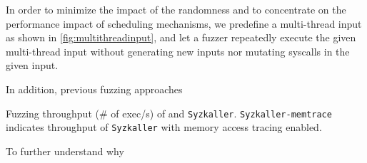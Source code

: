 In order to minimize the impact of the randomness and to concentrate
on the performance impact of scheduling mechanisms, we predefine a
multi-thread input as shown in \autoref{fig:multithreadinput}, and let
a fuzzer repeatedly execute the given multi-thread input without
generating new inputs nor mutating syscalls in the given input.

In addition, previous fuzzing approaches


%
\begin{table}[t]
  \small
  \centering
  
  \caption{Fuzzing throughput (\# of exec/s) of \sys and
    \texttt{Syzkaller}. \texttt{Syzkaller-memtrace} indicates
    throughput of \texttt{Syzkaller} with memory access tracing
    enabled.}
  \label{table:throughput}
\end{table}
%




%
To further understand why 






